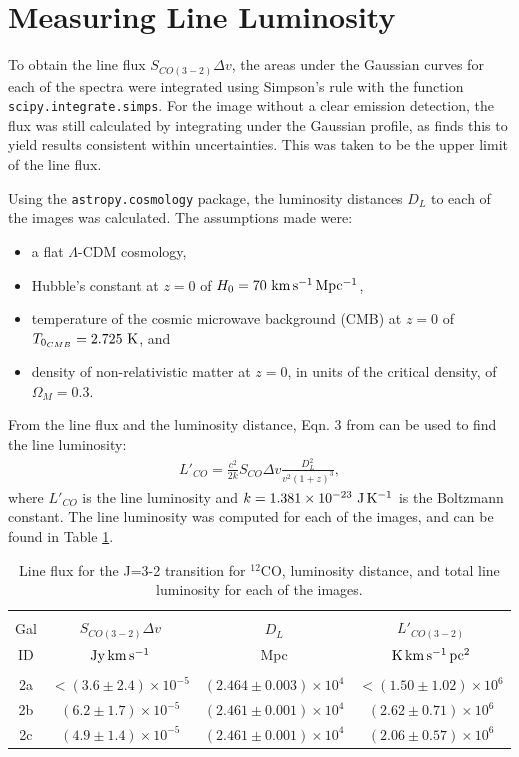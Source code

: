 \documentclass[11pt]{article}
\newcommand{\code}{\texttt}
\begin{document}
\section*{Measuring Line Luminosity}

To obtain the line flux $S_{CO(3-2)}\Delta v$, the areas under the Gaussian curves for each of the spectra were integrated using Simpson's rule with the function \code{scipy.integrate.simps}. For the image without a clear emission detection, the flux was still calculated by integrating under the Gaussian profile, as \cite{Combes2007} finds this to yield results consistent within uncertainties. This was taken to be the upper limit of the line flux. 

Using the \code{astropy.cosmology} package, the luminosity distances $D_L$ to each of the images was calculated. The assumptions made were:
\begin{itemize}
	\item a flat $\Lambda$-CDM cosmology,
	\item Hubble's constant at $z=0$ of $H_0 = 70~\rm{km\,s^{-1}\,Mpc^{-1}}$,
	\item temperature of the cosmic microwave background (CMB) at $z=0$ of $T_{0_{CMB}} = 2.725~{\rm K}$, and
	\item density of non-relativistic matter at $z=0$, in units of the critical density, of $\Omega_M = 0.3$.
\end{itemize}

From the line flux and the luminosity distance, Eqn. 3 from \cite{Solomon1992} can be used to find the line luminosity:
\begin{align}\label{eqn:linelum}
	L'_{CO} = \frac{c^2}{2k}S_{CO}\Delta v \frac{D_L^2}{v^2 (1+z)^3},
\end{align}
where $L'_{CO}$ is the line luminosity and $k = 1.381\times 10^{-23}~{\rm J\,K^{-1}}$ is the Boltzmann constant. The line luminosity was computed for each of the images, and can be found in Table \ref{table:line_lum}.

\begin{table}[!htbp]
\centering
\begin{tabular}{cccc}
\hline \\[-0.25cm]
Gal & $S_{CO(3-2)}\Delta v$ & $D_L$ & $L'_{CO(3-2)}$ \\
ID  & $\rm{Jy\,km\,s^{-1}}$ & Mpc   & $\rm{K\,km\,s^{-1}\,pc^2}$ \\[0.1cm]
\hline \\[-0.25cm]
2a & $<(3.6 \pm 2.4)\times 10^{-5}$ & $(2.464 \pm 0.003)\times 10^{4}$ & $<(1.50 \pm 1.02)\times 10^{6}$ \\
2b & $(6.2 \pm 1.7)\times 10^{-5}$  & $(2.461 \pm 0.001)\times 10^{4}$ & $(2.62 \pm 0.71)\times 10^{6}$  \\
2c & $(4.9 \pm 1.4)\times 10^{-5}$  & $(2.461 \pm 0.001)\times 10^{4}$ & $(2.06 \pm 0.57)\times 10^{6}$  \\
\hline
\end{tabular}
\caption{Line flux for the J=3-2 transition for $^{12}$CO, luminosity distance, and total line luminosity for each of the images.}
\label{table:line_lum}
\end{table}
\end{document}
